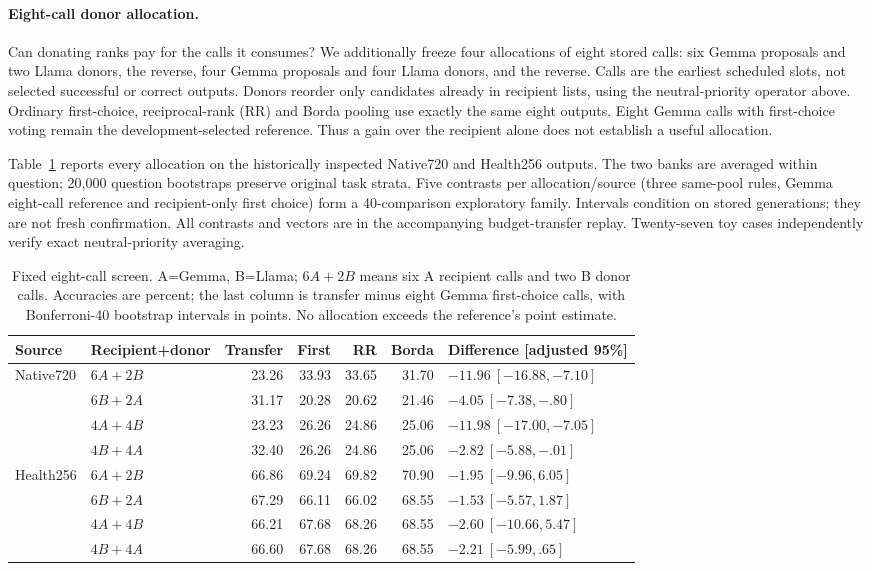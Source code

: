 \paragraph{Eight-call donor allocation.}
Can donating ranks pay for the calls it consumes? We additionally freeze four allocations of eight stored calls: six Gemma proposals and two Llama donors, the reverse, four Gemma proposals and four Llama donors, and the reverse. Calls are the earliest scheduled slots, not selected successful or correct outputs. Donors reorder only candidates already in recipient lists, using the neutral-priority operator above. Ordinary first-choice, reciprocal-rank (RR) and Borda pooling use exactly the same eight outputs. Eight Gemma calls with first-choice voting remain the development-selected reference. Thus a gain over the recipient alone does not establish a useful allocation.

Table~\ref{tab:budget_donor} reports every allocation on the historically inspected Native720 and Health256 outputs. The two banks are averaged within question; 20,000 question bootstraps preserve original task strata. Five contrasts per allocation/source (three same-pool rules, Gemma eight-call reference and recipient-only first choice) form a 40-comparison exploratory family. Intervals condition on stored generations; they are not fresh confirmation. All contrasts and vectors are in the accompanying budget-transfer replay. Twenty-seven toy cases independently verify exact neutral-priority averaging.

\begin{table}[ht]
\centering\small
\caption{Fixed eight-call screen. A=Gemma, B=Llama; $6A+2B$ means six A recipient calls and two B donor calls. Accuracies are percent; the last column is transfer minus eight Gemma first-choice calls, with Bonferroni-40 bootstrap intervals in points. No allocation exceeds the reference's point estimate.}
\label{tab:budget_donor}
\begin{tabular}{llrrrrl}
\toprule
Source & Recipient+donor & Transfer & First & RR & Borda & Difference [adjusted 95\%]\\
\midrule
Native720 & $6A+2B$ &23.26&33.93&33.65&31.70&$-11.96\ [-16.88,-7.10]$\\
& $6B+2A$ &31.17&20.28&20.62&21.46&$-4.05\ [-7.38,-.80]$\\
& $4A+4B$ &23.23&26.26&24.86&25.06&$-11.98\ [-17.00,-7.05]$\\
& $4B+4A$ &32.40&26.26&24.86&25.06&$-2.82\ [-5.88,-.01]$\\
Health256 & $6A+2B$ &66.86&69.24&69.82&70.90&$-1.95\ [-9.96,6.05]$\\
& $6B+2A$ &67.29&66.11&66.02&68.55&$-1.53\ [-5.57,1.87]$\\
& $4A+4B$ &66.21&67.68&68.26&68.55&$-2.60\ [-10.66,5.47]$\\
& $4B+4A$ &66.60&67.68&68.26&68.55&$-2.21\ [-5.99,.65]$\\
\bottomrule
\end{tabular}
\end{table}

